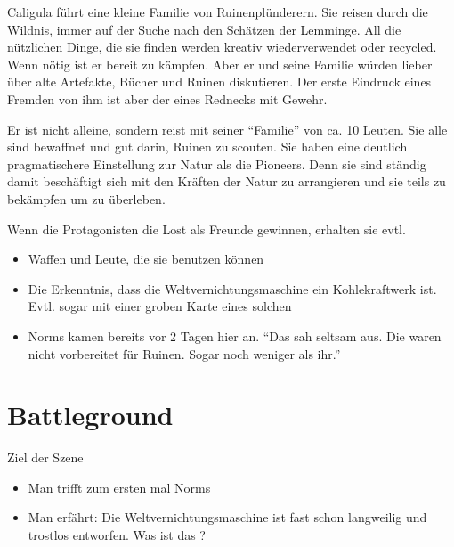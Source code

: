 \begin{npcBox}[title=Caligula]
    \begin{consequences}
    \item {}
    \item {}
    \item {}
    \end{consequences}

    \begin{npcDescription}
    Caligula führt eine kleine Familie von Ruinenplünderern. Sie reisen durch die Wildnis, immer auf der Suche nach den Schätzen der Lemminge. All die nützlichen Dinge, die sie finden werden kreativ wiederverwendet oder recycled.
    Wenn nötig ist er bereit zu kämpfen. Aber er und seine Familie würden lieber über alte Artefakte, Bücher und Ruinen diskutieren. Der erste Eindruck eines Fremden von ihm ist aber der eines Rednecks mit Gewehr.
    \end{npcDescription}

    \end{npcBox}

Er ist nicht alleine, sondern reist mit seiner \enquote{Familie} von ca. 10 Leuten. Sie alle sind bewaffnet und gut darin, Ruinen zu scouten. Sie haben eine deutlich pragmatischere Einstellung zur Natur als die Pioneers. Denn sie sind ständig damit beschäftigt sich mit den Kräften der Natur zu arrangieren und sie teils zu bekämpfen um zu überleben.

Wenn die Protagonisten die Lost als Freunde gewinnen, erhalten sie evtl.

\begin{itemize}
    \item Waffen und Leute, die sie benutzen können
    \item Die Erkenntnis, dass die Weltvernichtungsmaschine ein Kohlekraftwerk ist. Evtl. sogar mit einer groben Karte eines solchen
    \item Norms kamen bereits vor 2 Tagen hier an. \enquote{Das sah seltsam aus. Die waren nicht vorbereitet für Ruinen. Sogar noch weniger als ihr.}
\end{itemize}

\section{Battleground}

Ziel der Szene

\begin{itemize}
\item Man trifft zum ersten mal Norms
\item Man erfährt: Die Weltvernichtungsmaschine ist fast schon langweilig und trostlos entworfen. Was ist das ?
\end{itemize}

